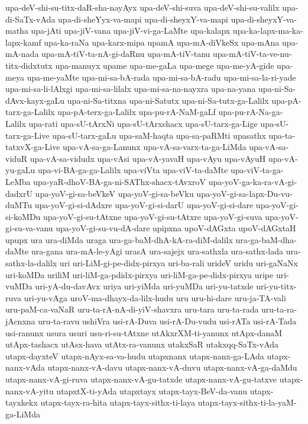 {upa-deV-shi-su-titx-daR-sha-nayAyx
upa-deV-shi-suva
upa-deV-shi-su-valilx
upa-di-SaTx-vAda
upa-di-sheYyx-va-mapi
upa-di-sheyxY-va-mapi
upa-di-sheyxY-va-matha
upa-jAti
upa-jiV-vana
upa-jiV-vi-ga-LaMte
upa-kalapx
upa-ka-lapx-ma-ka-lapx-kamf
upa-ka-raNa
upa-karx-mipa
upamA
upa-mA-diVkeSx
upa-mAna
upa-mA-nada
upa-mA-tiV-ta-nA-gi-daRnu
upa-mA-tiV-tanu
upa-mA-tiV-ta-ve-nu-titx-didxtutx
upa-manuyx
upame
upa-me-gaLa
upa-mege
upa-me-yA-gide
upa-meya
upa-me-yaMte
upa-mi-sa-bA-rada
upa-mi-sa-bA-radu
upa-mi-sa-la-ri-yade
upa-mi-sa-li-lAlxgi
upa-mi-sa-lilalx
upa-mi-sa-na-nayxra
upa-na-yana
upa-ni-Sa-dAvx-kayx-gaLu
upa-ni-Sa-titxna
upa-ni-Satutx
upa-ni-Sa-tutx-ga-Lalilx
upa-pA-tarx-ga-Lalilx
upa-pA-terx-ga-Lalilx
upa-pu-rA-NaM-gaLf
upa-pu-rA-Na-ga-Lalilx
upa-rati
upa-sU-tArxNi
upa-sU-tArxshacx
upa-sU-tarx-ga-Lige
upa-sU-tarx-ga-Live
upa-sU-tarx-gaLu
upa-saM-haqta
upa-sa-paRMti
upasathx
upa-ta-tatxvX-ga-Live
upa-vA-sa-ga-Lanunx
upa-vA-sa-varx-ta-ga-LiMda
upa-vA-sa-viduR
upa-vA-sa-vidudx
upa-vAsi
upa-vA-yavaH
upa-vAyu
upa-vAyuH
upa-vA-yu-gaLu
upa-vi-BA-ga-ga-Lalilx
upa-viVta
upa-viV-ta-daMte
upa-viV-ta-ga-LeMba
upa-yaR-dhoV-BA-ga-ni-SAThx-shacx-tAvxroV
upa-yoV-ga-ka-ra-vA-gi-dadxrU
upa-yoV-gi-sa-beVkeV
upa-yoV-gi-sa-beVku
upa-yoV-gi-sa-lapx-Du-vu-duMTu
upa-yoV-gi-si-dAdxre
upa-yoV-gi-si-darU
upa-yoV-gi-si-dare
upa-yoV-gi-si-koMDu
upa-yoV-gi-su-tAtxne
upa-yoV-gi-su-tAtxre
upa-yoV-gi-suva
upa-yoV-gi-su-va-vanu
upa-yoV-gi-su-vu-dA-dare
upipxna
upoV-dAGxta
upoV-dAGxtaH
upupx
ura
ura-diMda
uraga
ura-ga-baM-dhA-kA-ra-diM-dalilx
ura-ga-baM-dha-daMte
ura-gana
ura-mA-le-yAgi
urasA
ura-sajejx
ura-sathxla
ura-sathx-lada
ura-sathx-la-dalilx
uri
uri-LiM-gi-pe-didx-pirxya
uri-ba-rali
urideV
uridu
uri-gaNaNx
uri-koMDa
uriliM
uri-liM-ga-pdidx-pirxya
uri-liM-ga-pe-didx-pirxya
uripe
uri-vuMDa
uri-yA-du-davAvx
uriya
uri-yiMda
uri-yuMDa
uri-yu-tatxde
uri-yu-titx-ruva
uri-yu-vAga
uroV-ma-dhayx-da-lilx-hudu
uru
uru-hi-dare
uru-ja-TA-vali
uru-paM-ca-vaNaR
uru-ta-rA-nA-di-yiV-shavxra
uru-tara
uru-ta-rada
uru-ta-ra-jAcnxna
uru-ta-ravu
ushiVra
usi-rA-Duva
usi-rA-Du-vudu
usi-rATa
usi-rA-Tada
usi-ranunx
usura
usuri
usu-ri-su-tAtxne
utAkxrXM-ti-yanunx
utApx-danaM
utApx-tashacx
utAsx-hava
utAtx-ra-vanunx
utakxSaR
utakxqq-SaTx-vAda
utapx-dayxteV
utapx-nAyx-sa-va-hudu
utapxnanx
utapx-nanx-ga-LAda
utapx-nanx-vAda
utapx-nanx-vA-davu
utapx-nanx-vA-duvu
utapx-nanx-vA-ga-daMdu
utapx-nanx-vA-gi-ruva
utapx-nanx-vA-gu-tatxde
utapx-nanx-vA-gu-tatxve
utapx-nanx-vA-yitu
utapxtX-ti-yAda
utapxtayx
utapx-tayx-BeV-da-vanu
utapx-tayxkekx
utapx-tayx-ra-hita
utapx-tayx-sithx-ti-laya
utapx-tayx-sithx-ti-la-yaM-ga-LiMda
}
